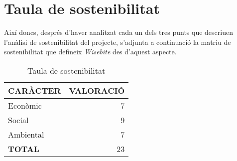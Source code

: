
\section{Taula de sostenibilitat}

Així doncs, després d'haver analitzat cada un dels tres punts que descriuen l'anàlisi de sostenibilitat del projecte, s'adjunta a continuació la matriu de sostenibilitat que defineix \textit{Wisebite} des d'aquest aspecte.
\\
\begin{table}[H]
\centering
\begin{tabular}{ | l | r |}
\hline
\textbf{CARÀCTER}								&\textbf{VALORACIÓ}		\\ \hline
Econòmic										& 7						\\ \hline
Social											& 9						\\ \hline
Ambiental										& 7						\\ \hline
\textbf{TOTAL}					 				& 23					\\ 
\hline
\end{tabular}
\caption{Taula de sostenibilitat}
\end{table}